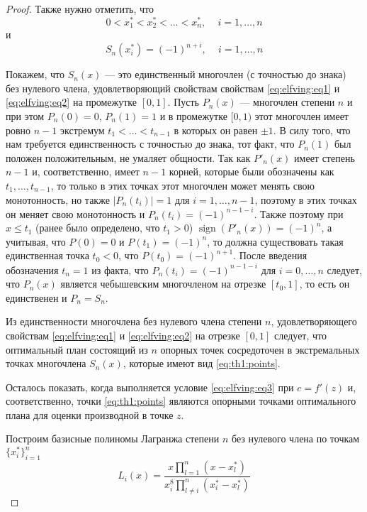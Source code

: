 \documentclass[specialist,
               substylefile = spbu.rtx,
               subf,href,colorlinks=true, 12pt]{disser}
\theoremstyle{definition}
\DeclareMathOperator*{\sign}{sign}
\newcommand\abs[1]{\left\lvert#1\right\rvert}
\begin{document}
\begin{proof}
	Также нужно отметить, что
	\begin{equation*}
		0 < x_1^* < x_2^* < \ldots < x_n^* , \, \quad i = 1, \ldots, n 
	\end{equation*}
	и
	\begin{equation*}
		S_n(x_i^*) = (-1)^{n + i} , \, \quad i = 1, \ldots, n 
	\end{equation*}
	
	Покажем, что $S_n(x)$ --- это единственный многочлен (с точностью до знака) без нулевого члена, удовлетворяющий свойствам свойствам \eqref{eq:elfving:eq1} и \eqref{eq:elfving:eq2} на промежутке $[0, 1]$. Пусть $P_n(x)$ --- многочлен степени $n$ и при этом $P_n(0) = 0$, $P_n(1) = 1$ и в промежутке $[0, 1)$ этот многочлен имеет ровно $n-1$ экстремум $t_1 < \ldots < t_{n-1}$ в которых он равен $\pm 1$. В силу того, что нам требуется единственность с точностью до знака, тот факт, что $P_n(1)$ был положен положительным, не умаляет общности. Так как $P'_n(x)$ имеет степень $n-1$ и, соответственно, имеет $n-1$ корней, которые были обозначены как $t_1, \ldots, t_{n-1}$, то только в этих точках этот многочлен может менять свою монотонность, но также $\abs{P_n(t_i)} = 1$ для $i = 1, \dots, n-1$, поэтому в этих точках он меняет свою монотонность и $P_n(t_i) = (-1)^{n-1-i}$. Также поэтому при $x \leqslant t_1$ (ранее было определено, что $t_1 > 0$) $\sign(P'_n(x)) = (-1)^n$, а учитывая, что $P(0) = 0$ и $P(t_1) = (-1)^n$, то должна существовать такая единственная точка $t_0 < 0$, что $P(t_0) = (-1)^{n+1}$. После введения обозначения $t_n = 1$ из факта, что $P_n(t_i) = (-1)^{n-1-i}$ для $i = 0, \ldots, n$ следует, что $P_n(x)$ является чебышевским многочленом на отрезке $[t_0, 1]$, то есть он единственен и $P_n = S_n$.
	
	Из единственности многочлена без нулевого члена степени $n$, удовлетворяющего свойствам \eqref{eq:elfving:eq1} и \eqref{eq:elfving:eq2} на отрезке $[0, 1]$ следует, что оптимальный план состоящий из $n$ опорных точек сосредоточен в экстремальных точках многочлена $S_n(x)$, которые имеют вид \eqref{eq:th1:points}.
	
	Осталось показать, когда выполняется условие \eqref{eq:elfving:eq3} при $c = f'(z)$ и, соответственно, точки \eqref{eq:th1:points} являются опорными точками оптимального плана для оценки производной в точке $z$.

	Построим базисные полиномы Лагранжа степени $n$ без нулевого члена по точкам $\{x_i^*\}_{i=1}^n$
	\begin{equation*}
		L_{i}(x) = \frac{x \prod_{l=1}^n (x - x_l^*)}{x_i^8 \prod_{l \neq i}^n (x_i^* - x_l^*)}
	\end{equation*}	
	

\end{proof}
\end{document}
